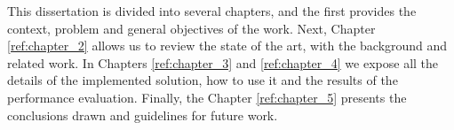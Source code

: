 This dissertation is divided into several chapters, and the first provides the context, problem and general objectives of the work. Next, Chapter \ref{ref:chapter_2} allows us to review the state of the art, with the background and related work. In Chapters \ref{ref:chapter_3} and \ref{ref:chapter_4} we expose all the details of the implemented solution, how to use it and the results of the performance evaluation. Finally, the Chapter \ref{ref:chapter_5} presents the conclusions drawn and guidelines for future work.